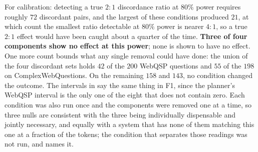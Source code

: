 For calibration: detecting a true $2{:}1$ discordance ratio at $80\%$
power requires roughly $72$ discordant pairs, and the largest of these
conditions produced $21$, at which count the smallest ratio detectable
at $80\%$ power is nearer $4{:}1$, so a true $2{:}1$ effect would have
been caught about a quarter of the time. \textbf{Three of four
components show no effect at this power}; none is shown to have no
effect. One more count bounds what any single removal could have done:
the union of the four discordant sets holds $42$ of the $200$ WebQSP
questions and $55$ of the $198$ on ComplexWebQuestions. On the remaining
$158$ and $143$, no condition changed the outcome. The intervals in
 say the same thing in F1, since the planner's WebQSP
interval is the only one of the eight that does not contain zero. Each
condition was also run once and the components were removed one at a
time, so three nulls are consistent with the three being individually
dispensable and jointly necessary, and equally with a system that has
none of them matching this one at a fraction of the tokens; the
condition that separates those readings was not run, and
 names it.
